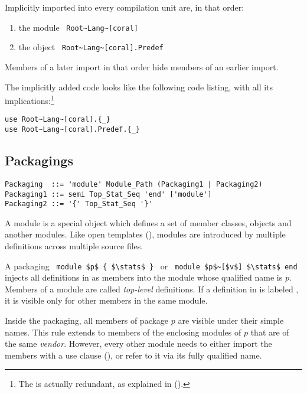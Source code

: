 Implicitly imported into every compilation unit are, in that order: 
\begin{enumerate}
\item the module ~\lstinline!Root~Lang~[coral]! 
\item the object ~\lstinline!Root~Lang~[coral].Predef!
\end{enumerate} 
Members of a later import in that order hide members of an earlier import. 


The implicitly added code looks like the following code listing, with all its implications:\footnote{The  is actually redundant, as explained in ().}
\begin{lstlisting}
use Root~Lang~[coral].{_}
use Root~Lang~[coral].Predef.{_}
\end{lstlisting}





\subsection{Packagings}

\syntax\begin{lstlisting}
Packaging  ::= 'module' Module_Path (Packaging1 | Packaging2)
Packaging1 ::= semi Top_Stat_Seq 'end' ['module']
Packaging2 ::= '{' Top_Stat_Seq '}'
\end{lstlisting}

A module is a special object which defines a set of member classes, objects and another modules. Like open templates (), modules are introduced by multiple definitions across multiple source files.  

A packaging ~\lstinline!module $p$ { $\stats$ }!~ or ~\lstinline!module $p$~[$v$] $\stats$ end!~ injects all definitions in \stats as members into the module whose qualified name is $p$. Members of a module are called {\em top-level} definitions. If a definition in \stats is labeled , it is visible only for other members in the same module. 

Inside the packaging, all members of package $p$ are visible under their simple names. This rule extends to members of the enclosing modules of $p$ that are of the same {\em vendor}. However, every other module needs to either import the members with a use clause (), or refer to it via its fully qualified name. 

